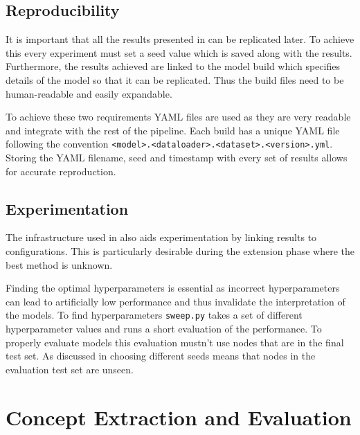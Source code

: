 \subsection{Reproducibility}
\label{sec:reproducibility}
It is important that all the results presented in  can be replicated later.
To achieve this every experiment must set a seed value which is saved along with the results.
Furthermore, the results achieved are linked to the model build which specifies details of the model so that it can be replicated.
Thus the build files need to be human-readable and easily expandable.

To achieve these two requirements YAML files are used as they are very readable and integrate with the rest of the pipeline.
Each build has a unique YAML file following the convention \texttt{<model>.<dataloader>.<dataset>.<version>.yml}.
Storing the YAML filename, seed and timestamp with every set of results allows for accurate reproduction.

\subsection{Experimentation}
The infrastructure used in  also aids experimentation by linking results to configurations.
This is particularly desirable during the extension phase where the best method is unknown.

Finding the optimal hyperparameters is essential as incorrect hyperparameters can lead to artificially low performance and thus invalidate the interpretation of the models.
To find hyperparameters \texttt{sweep.py} takes a set of different hyperparameter values and runs a short evaluation of the performance.
To properly evaluate models this evaluation mustn't use nodes that are in the final test set.
As discussed in  choosing different seeds means that nodes in the evaluation test set are unseen.

\section{Concept Extraction and Evaluation}
\label{sec:concepts}

